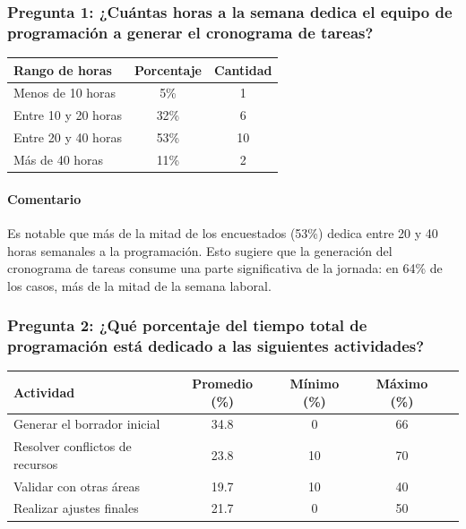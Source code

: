 \documentclass{article}
\begin{document}
\begin{appendix}
    \subsubsection*{Pregunta 1: ¿Cuántas horas a la semana dedica el equipo de programación a generar el cronograma de tareas?}
    
    
    
    \begin{table}[htbp]
        \centering
        \begin{tabular}{lcc}
            \toprule
            \textbf{Rango de horas} & \textbf{Porcentaje} & \textbf{Cantidad} \\
            \midrule
            Menos de 10 horas & 5\% & 1 \\
            Entre 10 y 20 horas & 32\% & 6 \\
            Entre 20 y 40 horas & 53\% & 10 \\
            Más de 40 horas & 11\% & 2 \\
            \bottomrule
        \end{tabular}
        \label{tab:horas_semanales}
    \end{table}
    
    \paragraph{Comentario} Es notable que más de la mitad de los encuestados (53\%) dedica entre 20 y 40 horas semanales a la programación. Esto sugiere que la generación del cronograma de tareas consume una parte significativa de la jornada: en 64\% de los casos, más de la mitad de la semana laboral.
    
    
    \vspace{1.5em}
    \subsubsection*{Pregunta 2: ¿Qué porcentaje del tiempo total de programación está dedicado a las siguientes actividades?}
    \vspace{.5em}
    
    \begin{table}[htbp]
        \centering
        \begin{tabular}{lccc c}
            \toprule
            \textbf{Actividad} & \textbf{Promedio (\%)} & \textbf{Mínimo (\%)} & \textbf{Máximo (\%)} \\
            \midrule
            Generar el borrador inicial & 34.8 & 0 & 66\\
            Resolver conflictos de recursos & 23.8 & 10 & 70\\
            Validar con otras áreas & 19.7 & 10 & 40\\
            Realizar ajustes finales & 21.7 & 0 & 50\\
            \bottomrule
        \end{tabular}
        \label{tab:distribucion_actividades}
    \end{table}
    

\end{appendix}
\end{document}
